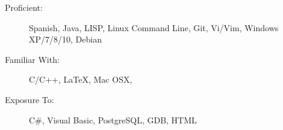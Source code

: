 \documentclass[letterpaper,11pt]{article}
\begin{document}
\begin{description}
  \item[Proficient:] {\normalsize 
      Spanish, Java, LISP, Linux Command Line, Git, Vi/Vim, Windows XP/7/8/10, Debian
    }
  \item[Familiar With:] {\normalsize 
      C/C++, \LaTeX, Mac OSX,
    }
  \item[Exposure To:]{\normalsize 
    C\#, Visual Basic, PostgreSQL, GDB, HTML
  }
\end{description} 

\footResume
\end{document}
